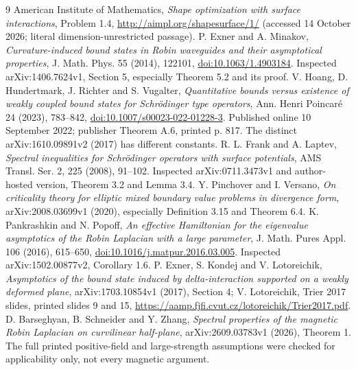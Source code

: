\documentclass[11pt]{article}
\begin{document}
\begin{thebibliography}{9}
 American Institute of Mathematics, \emph{Shape optimization with
surface interactions}, Problem 1.4, \url{http://aimpl.org/shapesurface/1/}
(accessed 14 October 2026; literal dimension-unrestricted passage).
 P. Exner and A. Minakov, \emph{Curvature-induced bound states in
Robin waveguides and their asymptotical properties}, J. Math. Phys. 55 (2014),
122101, \href{https://doi.org/10.1063/1.4903184}{doi:10.1063/1.4903184}.
Inspected arXiv:1406.7624v1, Section 5, especially Theorem 5.2 and its proof.
 V. Hoang, D. Hundertmark, J. Richter and S. Vugalter,
\emph{Quantitative bounds versus existence of weakly coupled bound states
for Schr\"odinger type operators}, Ann. Henri Poincar\'e 24 (2023), 783--842,
\href{https://doi.org/10.1007/s00023-022-01228-3}{doi:10.1007/s00023-022-01228-3}.
Published online 10 September 2022; publisher Theorem A.6, printed p. 817.
The distinct arXiv:1610.09891v2 (2017) has different constants.
 R. L. Frank and A. Laptev, \emph{Spectral inequalities for
Schr\"odinger operators with surface potentials}, AMS Transl. Ser. 2,
225 (2008), 91--102. Inspected arXiv:0711.3473v1 and author-hosted version,
Theorem 3.2 and Lemma 3.4.
 Y. Pinchover and I. Versano, \emph{On criticality theory for
elliptic mixed boundary value problems in divergence form},
arXiv:2008.03699v1 (2020), especially Definition 3.15 and Theorem 6.4.
 K. Pankrashkin and N. Popoff, \emph{An effective Hamiltonian
for the eigenvalue asymptotics of the Robin Laplacian with a large parameter},
J. Math. Pures Appl. 106 (2016), 615--650,
\href{https://doi.org/10.1016/j.matpur.2016.03.005}{doi:10.1016/j.matpur.2016.03.005}.
Inspected arXiv:1502.00877v2, Corollary 1.6.
 P. Exner, S. Kondej and V. Lotoreichik,
\emph{Asymptotics of the bound state induced by delta-interaction supported
on a weakly deformed plane}, arXiv:1703.10854v1 (2017), Section 4;
V. Lotoreichik, Trier 2017 slides, printed slides 9 and 15,
\url{https://aamp.fjfi.cvut.cz/lotoreichik/Trier2017.pdf}.
 D. Barseghyan, B. Schneider and Y. Zhang,
\emph{Spectral properties of the magnetic Robin Laplacian on curvilinear half-plane}, arXiv:2609.03783v1 (2026), Theorem 1.
The full printed positive-field and large-strength assumptions were checked
for applicability only, not every magnetic argument.
\end{thebibliography}
\end{document}
